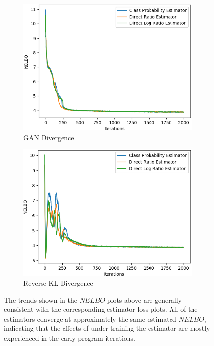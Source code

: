 \documentclass[honours,12pt, twoside]{unswthesis}
\numberwithin{equation}{section}
\theoremstyle{definition}
\begin{document}
\begin{figure}[h]
\begin{subfigure}{0.49\textwidth}
\includegraphics[width=\linewidth]{part2nelbos/PCADVvsPCADVexpvsPCADVgudlog.png}
\caption{GAN Divergence}
\end{subfigure}
\begin{subfigure}{0.49\textwidth}
\includegraphics[width=\linewidth]{part2nelbos/PCKLDvsPCKLexpvsPCKLgudlog.png}
\caption{Reverse KL Divergence}
\end{subfigure}
\caption{\small The trends shown in the $NELBO$ plots above are generally consistent with the corresponding estimator loss plots. All of the estimators converge at approximately the same estimated $NELBO$, indicating that the effects of under-training the estimator are mostly experienced in the early program iterations.}
\end{figure}
\end{document}
